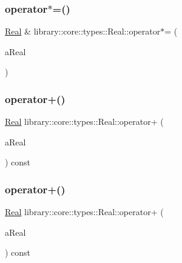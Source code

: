 \subsubsection{\texorpdfstring{operator$\ast$=()}{operator*=()}\hspace{0.1cm}{\footnotesize\ttfamily [2/2]}}
{\footnotesize\ttfamily \hyperlink{classlibrary_1_1core_1_1types_1_1_real}{Real} \& library\+::core\+::types\+::\+Real\+::operator$\ast$= (\begin{DoxyParamCaption}\item[{const \hyperlink{classlibrary_1_1core_1_1types_1_1_real_a9c5c8826b7e5a8e39544d23fea6c0e1c}{Real\+::\+Value\+Type} \&}]{a\+Real }\end{DoxyParamCaption})}

\mbox{\label{classlibrary_1_1core_1_1types_1_1_real_a1f5ed9019063814bd13c0cebc7c9fa1a}} 
\subsubsection{\texorpdfstring{operator+()}{operator+()}\hspace{0.1cm}{\footnotesize\ttfamily [1/3]}}
{\footnotesize\ttfamily \hyperlink{classlibrary_1_1core_1_1types_1_1_real}{Real} library\+::core\+::types\+::\+Real\+::operator+ (\begin{DoxyParamCaption}\item[{const \hyperlink{classlibrary_1_1core_1_1types_1_1_real}{Real} \&}]{a\+Real }\end{DoxyParamCaption}) const}

\mbox{\label{classlibrary_1_1core_1_1types_1_1_real_aee62d1d76e3b0ba37dc9bebdbdcdaaf7}} 
\subsubsection{\texorpdfstring{operator+()}{operator+()}\hspace{0.1cm}{\footnotesize\ttfamily [2/3]}}
{\footnotesize\ttfamily \hyperlink{classlibrary_1_1core_1_1types_1_1_real}{Real} library\+::core\+::types\+::\+Real\+::operator+ (\begin{DoxyParamCaption}\item[{const \hyperlink{classlibrary_1_1core_1_1types_1_1_real_a9c5c8826b7e5a8e39544d23fea6c0e1c}{Real\+::\+Value\+Type} \&}]{a\+Real }\end{DoxyParamCaption}) const}

